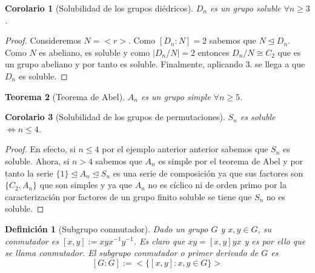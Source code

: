 \documentclass{article}
\theoremstyle{theorem-style}  %
\newtheorem{theorem}{Teorema}[section]  %
\newtheorem{corollary}[theorem]{Corolario} %
\theoremstyle{definition-style}
\newtheorem{definition}{Definición}[section]
\theoremstyle{example-style}
\begin{document}
\begin{corollary}[Solubilidad de los grupos diédricos]
$D_n$ es un grupo soluble $\forall n \ge 3$.
\end{corollary}
\begin{proof}
Consideremos $N = <r>$. Como $[D_n:N] = 2$ sabemos que $N \trianglelefteq D_n$. Como $N$ es abeliano, es soluble y como $|D_n/N| = 2$ entonces $D_n/N \cong C_2$ que es un grupo abeliano y por tanto es soluble. Finalmente, aplicando 3. se llega a que $D_n$ es soluble.
\end{proof}

\begin{theorem}[Teorema de Abel]
$A_n$ es un grupo simple $\forall n \ge 5$.
\end{theorem}

\begin{corollary}[Solubilidad de los grupos de permutaciones]
$S_n$ es soluble $\iff n \le 4$.
\end{corollary}
\begin{proof}
En efecto, si $n \le 4$ por el ejemplo anterior anterior sabemos que $S_n$ es soluble. Ahora, si $n > 4$ sabemos que $A_n$ es simple por el teorema de Abel y por tanto la serie $\{1\} \trianglelefteq A_n \trianglelefteq S_n$ es una serie de composición ya que sus factores son $\{C_2,A_n\}$ que son simples y ya que $A_n$ no es cíclico ni de orden primo por la caracterización por factores de un grupo finito soluble se tiene que $S_n$ no es soluble.
\end{proof}

\begin{definition}[Subgrupo conmutador]
Dado un grupo $G$ y $x,y \in G$, su conmutador es $[x,y] := xyx^{-1}y^{-1}$. Es claro que $xy = [x,y]yx$ y es por ello que se llama conmutador. El subgrupo conmutador o primer derivado de $G$ es $$[G:G] := <\{[x,y]:x,y \in G\}>$$
\end{definition}
\end{document}
